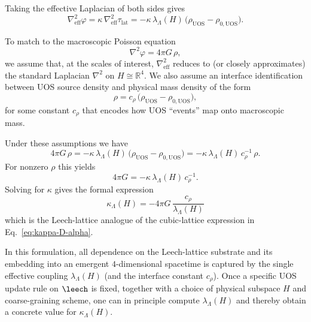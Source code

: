 Taking the effective Laplacian of both sides gives
\begin{equation}
  \nabla^2_{\text{eff}} \varphi =
  \kappa\,\nabla^2_{\text{eff}} \tau_{\mathrm{lat}} =
  -\kappa\,\lambda_{\Lambda}(H)
  \,\big(\rho_{\mathrm{UOS}} - \rho_{0,\mathrm{UOS}}\big).
\end{equation}

To match to the macroscopic Poisson equation
\begin{equation}
  \nabla^2 \varphi = 4\pi G\,\rho,
\end{equation}
we assume that, at the scales of interest, $\nabla^2_{\text{eff}}$ reduces to
(or closely approximates) the standard Laplacian $\nabla^2$ on $H \cong
\mathbb{R}^4$. We also assume an interface identification between UOS source
density and physical mass density of the form
\begin{equation}
  \rho = c_{\rho}\,\big(\rho_{\mathrm{UOS}} - \rho_{0,\mathrm{UOS}}\big),
\end{equation}
for some constant $c_{\rho}$ that encodes how UOS ``events'' map onto
macroscopic mass.

Under these assumptions we have
\begin{equation}
  4\pi G\,\rho =
  -\kappa\,\lambda_{\Lambda}(H)
   \,\big(\rho_{\mathrm{UOS}} - \rho_{0,\mathrm{UOS}}\big) =
  -\kappa\,\lambda_{\Lambda}(H)\,c_{\rho}^{-1}\,\rho.
\end{equation}
For nonzero $\rho$ this yields
\begin{equation}
  4\pi G = -\kappa\,\lambda_{\Lambda}(H)\,c_{\rho}^{-1}.
\end{equation}
Solving for $\kappa$ gives the formal expression
\begin{equation}
  \boxed{
    \kappa_{\Lambda}(H) =
    -4\pi G\,\frac{c_{\rho}}{\lambda_{\Lambda}(H)}
  }
  \label{eq:kappa-leech-formal}
\end{equation}
which is the Leech-lattice analogue of the cubic-lattice expression in
Eq.~\eqref{eq:kappa-D-alpha}.

In this formulation, all dependence on the Leech-lattice substrate and its
embedding into an emergent $4$-dimensional spacetime is captured by the single
effective coupling $\lambda_{\Lambda}(H)$ (and the interface constant
$c_{\rho}$). Once a specific UOS update rule on $\leech$ is fixed, together
with a choice of physical subspace $H$ and coarse-graining scheme, one can in
principle compute $\lambda_{\Lambda}(H)$ and thereby obtain a concrete value
for $\kappa_{\Lambda}(H)$.

